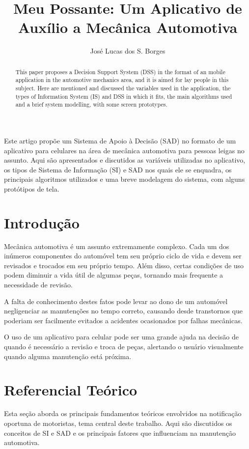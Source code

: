 \documentclass[12pt]{article}
\title{Meu Possante: Um Aplicativo de Auxílio a Mecânica Automotiva}
\author{José Lucas dos S. Borges{\inst1}}
\begin{document}
\maketitle

\begin{abstract}
    This paper proposes a Decision Support System (DSS) in the format of an
    mobile application in the automotive mechanics area, and it is aimed for
    lay people in this subject. Here are mentioned and discussed the variables
    used in the application, the types of Information System (IS) and DSS in
    which it fits, the main algorithms used and a brief system modelling, with
    some screen prototypes.
\end{abstract}

\begin{resumo}
    Este artigo propõe um Sistema de Apoio à Decisão (SAD) no formato de um
    aplicativo para celulares na área de mecânica automotiva para pessoas leigas
    no assunto. Aqui são apresentados e discutidos as variáveis utilizadas no
    aplicativo, os tipos de Sistema de Informação (SI) e SAD nos quais ele se
    enquadra, os principais algoritmos utilizados e uma breve modelagem do
    sistema, com alguns protótipos de tela.
\end{resumo}


\section{Introdução} \label{sec:introducao}

Mecânica automotiva é um assunto extremamente complexo. Cada um dos inúmeros
componentes do automóvel tem seu próprio ciclo de vida e devem ser revisados
e trocados em seu próprio tempo. Além disso, certas condições de uso podem
diminuir a vida útil de algumas peças, tornando mais frequente a necessidade
de revisão.

A falta de conhecimento destes fatos pode levar ao dono de um automóvel
negligenciar as manutenções no tempo correto, causando desde transtornos
que poderiam ser facilmente evitados a acidentes ocasionados por falhas
mecânicas.

O uso de um aplicativo para celular pode ser uma grande ajuda na decisão de
quando é necessário a revisão e troca de peças, alertando o usuário
visualmente quando alguma manutenção está próxima.

\section{Referencial Teórico} \label{sec:referencialteorico}
Esta seção aborda os principais fundamentos teóricos envolvidos na notificação
oportuna de motoristas, tema central deste trabalho. Aqui são discutidos os
conceitos de SI e SAD e os principais fatores que influenciam na manutenção
automotiva.
\end{document}
